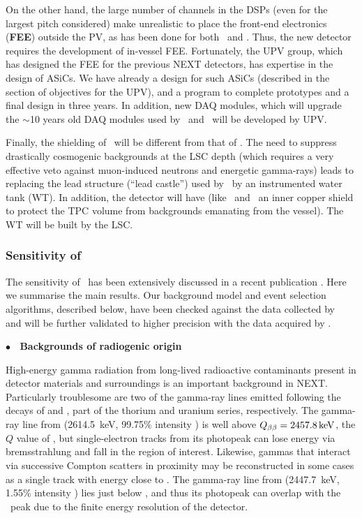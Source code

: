 \indent

On the other hand, the large number of channels in the DSPs (even for the largest pitch considered) make unrealistic to place the front-end electronics ({\bf FEE}) outside the PV, as has been done for both \NEW\ and \Next. Thus, the new detector requires the development of in-vessel FEE. Fortunately, the UPV group, which has designed the FEE for the previous NEXT detectors, has expertise in the design of ASiCs. We have already a design for such ASiCs (described in the section of objectives for the UPV), and a program to complete prototypes and a final design in three years. In addition, new DAQ modules, which will upgrade the $\sim$10 years old DAQ modules used by \NEW\ and \Next\ will be developed by UPV. 

\indent

Finally, the shielding of \NHD\ will be different from that of \Next. The need to suppress drastically cosmogenic backgrounds at the LSC depth (which requires a very effective veto against muon-induced neutrons and energetic gamma-rays) leads to replacing the lead structure (``lead castle'') used by \Next\ by an instrumented water tank (WT). In addition, the detector will have (like \NEW\ and \Next\ an inner copper shield to protect the TPC volume from backgrounds emanating from the vessel). The WT will be built by the LSC. 


\subsubsection{Sensitivity of \NHD}
\label{sec:BackgroundsAtTheTonneScale}

The sensitivity of \NHD\ has been extensively discussed in a recent publication \cite{NEXT:2020amj}. Here we summarise the main results. 
Our background model and event selection algorithms, described below, have been checked against the data collected by \NEW\ \cite{Novella:2019cne} and will be further validated to higher precision with the data acquired  by \Next. 

\indent

{\bf $\bullet$~ Backgrounds of radiogenic origin}

\indent
High-energy gamma radiation from long-lived radioactive contaminants present in detector materials and surroundings is an important background in NEXT. Particularly troublesome are two of the gamma-ray lines emitted following the decays of  and , part of the thorium and uranium series, respectively. The gamma-ray line from  (2614.5~keV, 99.75\% intensity \cite{nudat}) is well above $\Qbb=\SI{2457.8}{\kilo\eV}$, the $Q$ value of , but single-electron tracks from its photopeak can lose energy via bremsstrahlung and fall in the region of interest. Likewise, gammas that interact via successive Compton scatters in proximity may be reconstructed in some cases as a single track with energy close to \Qbb. The gamma-ray line from  (2447.7~keV, 1.55\% intensity \cite{nudat}) lies just below \Qbb, and thus its photopeak can overlap with the \bbonu\ peak due to the finite energy resolution of the detector.

